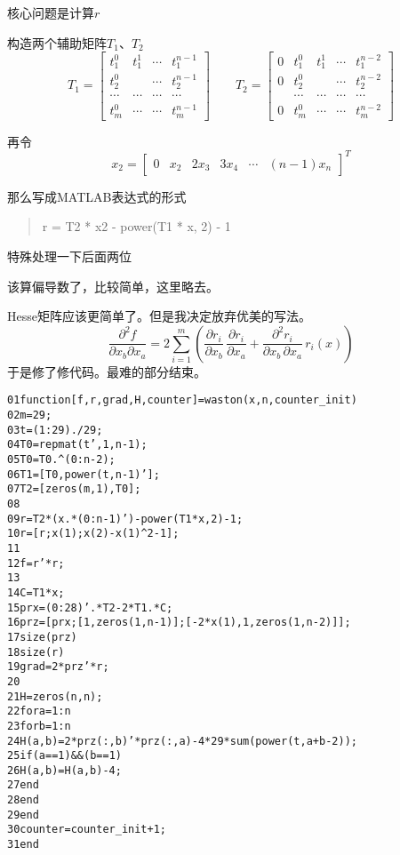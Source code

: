 \documentclass[a4paper, 11pt]{article}
\begin{document}
核心问题是计算$r$

构造两个辅助矩阵$T_1$、$T_2$
\begin{equation*}
T_1=
\begin{bmatrix}
t_1^0 & t_1^1 & \cdots & t_1^{n-1}\\
t_2^0 & & \cdots & t_2^{n-1}\\
\cdots & \cdots &\cdots & \cdots\\
t_m^0 & \cdots &\cdots & t_m^{n-1}
\end{bmatrix}
\qquad 
T_2=
\begin{bmatrix}
0 & t_1^0 & t_1^1 & \cdots & t_1^{n-2}\\
0 & t_2^0 & & \cdots & t_2^{n-2}\\
  & \cdots & \cdots &\cdots & \cdots\\
0 & t_m^0 & \cdots &\cdots & t_m^{n-2}
\end{bmatrix}
\end{equation*}

再令
\begin{equation*}
x_2=
\begin{bmatrix}
	0 & x_2 & 2x_3 & 3x_4 &\cdots & (n-1)x_n
\end{bmatrix}^T
\end{equation*}

那么写成MATLAB表达式的形式
\begin{verse}
	r = T2 * x2 - power(T1 * x, 2) - 1
\end{verse}

特殊处理一下后面两位

该算偏导数了，比较简单，这里略去。

Hesse矩阵应该更简单了。但是我决定放弃优美的写法。
\[
\frac{\partial^2 f}{\partial x_b \partial x_a}=2\sum_{i=1}^{m}\left(\frac{\partial r_i}{\partial x_b}\,\frac{\partial r_i}{\partial x_a}+\frac{\partial^2r_i}{\partial x_b\,\partial x_a}\,r_i(x)\right)
\]
于是修了修代码。最难的部分结束。

\begin{alltt}
	01 \textcolor{keyword}{function} [f, r, grad, H, counter] = waston(x, n, counter\_init)
	02     m = 29;
	03     t = (1:29) ./ 29; 
	04     T0 = repmat(t', 1, n - 1);
	05     T0 = T0 .\^{} (0:n-2);
	06     T1 = [T0, power(t, n - 1)'];
	07     T2 = [zeros(m, 1), T0];
	08     
	09     r = T2 * (x .* (0:n-1)') - power(T1 * x, 2) - 1;
	10     r = [r; x(1); x(2) - x(1) \^{} 2 - 1];
	11 
	12     f = r' * r;
	13     
	14     C = T1 * x;
	15     prx = (0:28)' .* T2 - 2 * T1 .* C;
	16     prz = [prx; [1, zeros(1, n-1)]; [-2 * x(1), 1, zeros(1, n-2)]];
	17     size(prz)
	18     size(r)
	19     grad = 2 * prz' * r;
	20     
	21     H = zeros(n, n);
	22     \textcolor{keyword}{for} a = 1:n
	23         \textcolor{keyword}{for} b = 1:n
	24             H(a, b) = 2 * prz(:, b)' * prz(:, a) - 4 * 29 * sum(power(t, a + b - 2));
	25             \textcolor{keyword}{if} (a == 1) \&\& (b == 1) 
	26                 H(a, b) = H(a, b) - 4;
	27             \textcolor{keyword}{end}
	28         \textcolor{keyword}{end}
	29     \textcolor{keyword}{end}
	30     counter = counter\_init + 1;
	31 \textcolor{keyword}{end}
\end{alltt}
\end{document}
